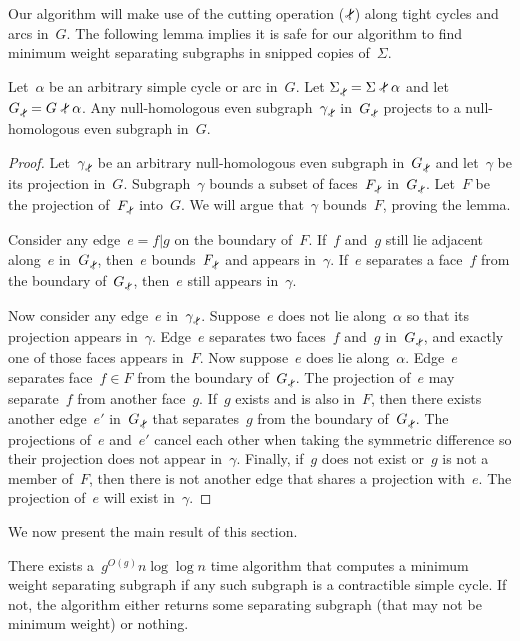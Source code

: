 Our algorithm will make use of the cutting operation ($\snip$) along tight cycles and arcs in~$G$.
The following lemma implies it is safe for our algorithm to find minimum weight separating subgraphs in snipped copies of~$\Sigma$.
\begin{lemma}
\label{lem:global_null-homologous-projections}
Let~$\alpha$ be an arbitrary simple cycle or arc in~$G$. Let
${\Sigmasnip = \Sigma \snip \alpha}$ and let~$\Gsnip = G \snip \alpha$. Any null-homologous even subgraph~$\gammasnip$ in~$\Gsnip$ projects to a null-homologous even subgraph in~$G$.
\end{lemma}
\begin{proof}
Let~$\gammasnip$ be an arbitrary null-homologous even subgraph in~$\Gsnip$ and let~$\gamma$ be its projection in~$G$.
Subgraph~$\gamma$ bounds a subset of faces~$F_{\subsnip}$ in~$\Gsnip$. 
Let~$F$ be the projection of~$F_{\subsnip}$ into~$G$.
We will argue that~$\gamma$ bounds~$F$, proving the lemma.

Consider any edge~$e = f | g$ on the boundary of~$F$. If~$f$ and~$g$ still lie adjacent along~$e$ in~$\Gsnip$, then~$e$ bounds~$F_{\subsnip}$ and appears in~$\gamma$. If~$e$ separates a face~$f$ from the boundary of~$\Gsnip$, then~$e$ still appears in~$\gamma$.

Now consider any edge~$e$ in~$\gammasnip$. Suppose~$e$ does not lie along~$\alpha$ so that its projection appears in~$\gamma$. Edge~$e$ separates two faces~$f$ and~$g$ in~$\Gsnip$, and exactly one of those faces appears in~$F$. Now suppose~$e$ does lie along~$\alpha$. Edge~$e$ separates face~$f \in F$ from the boundary of~$\Gsnip$. The projection of~$e$ may separate~$f$ from another face~$g$. If~$g$ exists and is also in~$F$, then there exists another edge~$e'$ in~$\Gsnip$ that separates~$g$ from the boundary of~$\Gsnip$. The projections of~$e$ and~$e'$ cancel each other when taking the symmetric difference so their projection does not appear in~$\gamma$. Finally, if~$g$ does not exist or~$g$ is not a member of~$F$, then there is not another edge that shares a projection with~$e$. The projection of~$e$ will exist in~$\gamma$.
\end{proof}

We now present the main result of this section.
\begin{lemma}
\label{lem:contractible-alg}
There exists a~$g^{O(g)} n \log \log n$ time algorithm that computes a minimum weight separating subgraph if any such subgraph is a contractible simple cycle. If not, the algorithm either returns some separating subgraph (that may not be minimum weight) or nothing.
\end{lemma}

